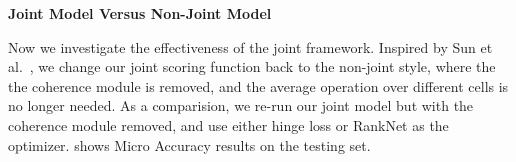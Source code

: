 \noindent
\textbf{Joint Model Versus Non-Joint Model}

Now we investigate the effectiveness of the joint framework.
Inspired by Sun et al.~,
we change our joint scoring function back to the non-joint style,
where the the coherence module is removed,
and the average operation over different cells is no longer needed.
%
%
As a comparision, we re-run our joint model but with the coherence module removed,
and use either hinge loss or RankNet as the optimizer.
 shows Micro Accuracy results on the testing set.
